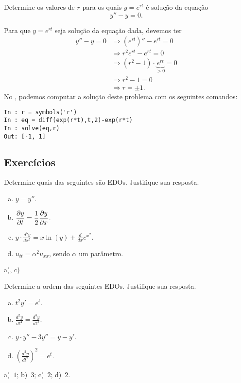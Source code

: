 \begin{exeresol}
  Determine os valores de $r$ para os quais $y = e^{rt}$ é solução da equação
  \begin{equation}
    y'' - y = 0.
  \end{equation}
\end{exeresol}
\begin{resol}
  Para que $y = e^{rt}$ seja solução da equação dada, devemos ter
  \begin{align}
    y'' - y = 0 &\Rightarrow \left(e^{rt}\right)'' - e^{rt} = 0 \\
                &\Rightarrow r^2e^{rt} - e^{rt} = 0 \\
                &\Rightarrow (r^2 - 1)\cdot \underbrace{e^{rt}}_{>0} = 0\\
                &\Rightarrow r^2 - 1 = 0 \\
                &\Rightarrow r = \pm 1.
  \end{align}
  \ifispython
  No \python, podemos computar a solução deste problema com os seguintes comandos:
\begin{verbatim}
In : r = symbols('r')
In : eq = diff(exp(r*t),t,2)-exp(r*t)
In : solve(eq,r)
Out: [-1, 1]
\end{verbatim}
  \fi
\end{resol}

\subsection*{Exercícios}

\begin{exer}
  Determine quais das seguintes são EDOs. Justifique sua resposta.
  \begin{enumerate}[a)]
  \item $\displaystyle y = y''$.
  \item $\displaystyle \frac{\partial y}{\partial t} = \frac{1}{2}\frac{\partial y}{\partial x}$.
  \item $\displaystyle y\cdot \frac{d^5y}{dx^5} = x\ln(y) + \frac{d}{dx}e^{x^2}$.
  \item $u_{tt} = \alpha^2u_{xx}$, sendo $\alpha$ um parâmetro.
  \end{enumerate}
\end{exer}
\begin{resp}
  a), c)
\end{resp}

\begin{exer}\label{exer:edo_ordem}
  Determine a ordem das seguintes EDOs. Justifique sua resposta.
  \begin{enumerate}[a)]
  \item $\displaystyle t^2y' = e^{t}$.
  \item $\displaystyle \frac{d^2y}{dt^2} = \frac{d^3y}{dt^3}$.
  \item $\displaystyle y\cdot y'' - 3y'' = y - y'$.
  \item $\displaystyle \left(\frac{d^2y}{dt^2}\right)^2 = e^t$.
  \end{enumerate}
\end{exer}
\begin{resp}
  a)~$1$; b)~$3$; c)~$2$; d)~$2$.
\end{resp}

